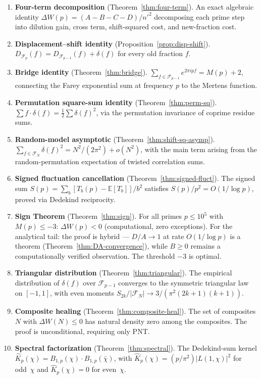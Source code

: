 \documentclass[11pt]{article}
\theoremstyle{definition}
\newcommand{\F}{\mathcal{F}}
\begin{document}
\begin{enumerate}[(1)]
  \item \textbf{Four-term decomposition} (Theorem~\ref{thm:four-term}).
    An exact algebraic identity
    $\Delta W(p) = (A - B - C - D)/n'^2$
    decomposing each prime step into dilution gain, cross term,
    shift-squared cost, and new-fraction cost.

  \item \textbf{Displacement--shift identity} (Proposition~\ref{prop:disp-shift}).
    $D_{\F_p}(f) = D_{\F_{p-1}}(f) + \delta(f)$
    for every old fraction $f$.

  \item \textbf{Bridge identity} (Theorem~\ref{thm:bridge}).
    $\sum_{f \in \F_{p-1}} e^{2\pi ipf} = M(p) + 2$,
    connecting the Farey exponential sum at frequency $p$ to the
    Mertens function.

  \item \textbf{Permutation square-sum identity} (Theorem~\ref{thm:perm-sq}).
    $\sum f \cdot \delta(f) = \tfrac{1}{2}\sum \delta(f)^2$,
    via the permutation invariance of coprime residue sums.

  \item \textbf{Random-model asymptotic} (Theorem~\ref{thm:shift-sq-asymp}).
    $\sum_{f \in \F_N} \delta(f)^2 = N^2/(2\pi^2) + o(N^2)$,
    with the main term arising from the random-permutation
    expectation of twisted correlation sums.

  \item \textbf{Signed fluctuation cancellation} (Theorem~\ref{thm:signed-fluct}).
    The signed sum $S(p) = \sum_b [T_b(p) - \mathbb{E}[T_b]]/b^2$
    satisfies $S(p)/p^2 = O(1/\log p)$, proved via Dedekind
    reciprocity.

  \item \textbf{Sign Theorem} (Theorem~\ref{thm:sign}).
    For all primes $p \le 10^5$ with $M(p) \le -3$:
    $\Delta W(p) < 0$ (computational, zero exceptions).
    For the analytical tail: the proof is hybrid ---
    $D/A \to 1$ at rate $O(1/\log p)$ is a theorem
    (Theorem~\ref{thm:DA-convergence}), while $B \ge 0$
    remains a computationally verified observation.
    The threshold $-3$ is optimal.

  \item \textbf{Triangular distribution} (Theorem~\ref{thm:triangular}).
    The empirical distribution of $\delta(f)$ over $\F_{p-1}$
    converges to the symmetric triangular law on $[-1,1]$, with
    even moments
    $S_{2k}/|\F_N| \to 3/(\pi^2(2k+1)(k+1))$.

  \item \textbf{Composite healing} (Theorem~\ref{thm:composite-heal}).
    The set of composites $N$ with $\Delta W(N) \le 0$
    has natural density zero among the composites.
    The proof is unconditional, requiring only PNT.

  \item \textbf{Spectral factorization} (Theorem~\ref{thm:spectral}).
    The Dedekind-sum kernel $\hat{K}_p(\chi) = B_{1,p}(\chi) \cdot
    B_{1,p}(\bar{\chi})$, with
    $\hat{K}_p(\chi) = (p/\pi^2)|L(1,\chi)|^2$ for odd~$\chi$ and
    $\hat{K}_p(\chi) = 0$ for even~$\chi$.
\end{enumerate}
\end{document}
